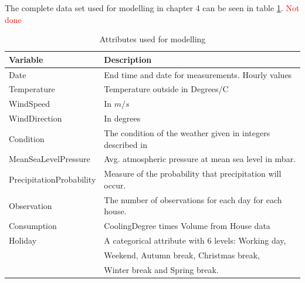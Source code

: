 \noindent The complete data set used for modelling in chapter 4 can be seen in table \ref{tab: modeldata}. \textcolor{red}{Not done}
\begin{table}
    \centering
    \begin{tabular}{ll}
     \hline
     \textbf{Variable} & \textbf{Description} \\
    \hline
    \hline
    Date  &  End time and date for measurements. Hourly values\\
    Temperature  &  Temperature outside in Degrees/C \\
    WindSpeed  &  In $m/s$\\ 
    WindDirection  &  In degrees\\
    Condition  & The condition of the weather given in integers described in \cite{condition}\\
    MeanSeaLevelPressure & Avg. atmospheric pressure at mean sea level in mbar.\\
    PrecipitationProbability & Measure of the probability that precipitation will occur. \\
    Observation & The number of observations for each day for each house.\\
    Consumption & CoolingDegree times Volume from House data \\
    Holiday & A categorical attribute with 6 levels: Working day, \\ & Weekend, Autumn break, Christmas break, \\ & Winter break and Spring break.\\
    \hline
    \end{tabular}
    \caption{Attributes used for modelling}
    \label{tab: modeldata}
\end{table}   

